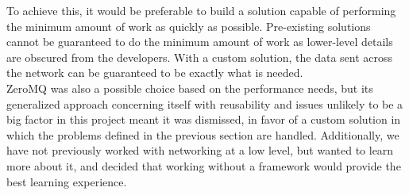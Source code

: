 To achieve this, it would be preferable to build a solution capable of performing the minimum amount of work as quickly as possible.
Pre-existing solutions cannot be guaranteed to do the minimum amount of work as lower-level details are obscured from the developers.
With a custom solution, the data sent across the network can be guaranteed to be exactly what is needed.\\
ZeroMQ was also a possible choice based on the performance needs, but its generalized approach concerning itself with reusability and issues unlikely to be a big factor in this project meant it was dismissed, in favor of a custom solution in which the problems defined in the previous section are handled.
Additionally, we have not previously worked with networking at a low level, but wanted to learn more about it, and decided that working without a framework would provide the best learning experience.

